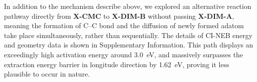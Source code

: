 \documentclass[%
 reprint,
 amsmath,amssymb,
 aps,
prb,
floatfix,
]{revtex4-2}
\newcommand{\sinfo}{Supplementary Information}
\begin{document}
{%




In addition to the mechanism describe above, we explored an alternative reaction pathway directly from \textbf{X-CMC} to \textbf{X-DIM-B} without passing \textbf{X-DIM-A}, meaning the formation of C--C bond and the diffusion of newly formed adatom take place simultaneously, rather than sequentially. The details of CI-NEB energy and geometry data is shown in \sinfo. This path displays an exceedingly high activation energy around \SI{3.0}{\electronvolt}, and massively surpasses the extraction energy barrier in longitude direction by \SI{1.62}{\electronvolt}, proving it less plausible to occur in nature.

}
\end{document}
